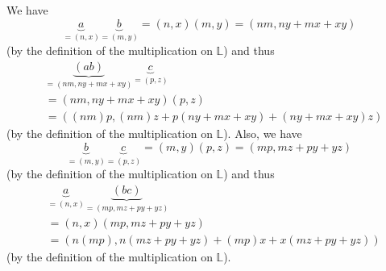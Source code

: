 \documentclass[paper=a4, fontsize=12pt]{scrartcl}%
\theoremstyle{plainsl}
\theoremstyle{definition}
\theoremstyle{remark}
\begin{document}
We have
\[
\underbrace{a}_{=\left(  n,x\right)  }\underbrace{b}_{=\left(  m,y\right)
}=\left(  n,x\right)  \left(  m,y\right)  =\left(  nm,ny+mx+xy\right)
\]
(by the definition of the multiplication on $\mathbb{L}$) and thus%
\begin{align}
&  \underbrace{\left(  ab\right)  }_{=\left(  nm,ny+mx+xy\right)
}\underbrace{c}_{=\left(  p,z\right)  }\nonumber\\
&  =\left(  nm,ny+mx+xy\right)  \left(  p,z\right) \nonumber\\
&  =\left(  \left(  nm\right)  p,\left(  nm\right)  z+p\left(
ny+mx+xy\right)  +\left(  ny+mx+xy\right)  z\right)
\label{sol.ring.dorroh.assoc-mul.pf.1}%
\end{align}
(by the definition of the multiplication on $\mathbb{L}$). Also, we have%
\[
\underbrace{b}_{=\left(  m,y\right)  }\underbrace{c}_{=\left(  p,z\right)
}=\left(  m,y\right)  \left(  p,z\right)  =\left(  mp,mz+py+yz\right)
\]
(by the definition of the multiplication on $\mathbb{L}$) and thus%
\begin{align}
&  \underbrace{a}_{=\left(  n,x\right)  }\underbrace{\left(  bc\right)
}_{=\left(  mp,mz+py+yz\right)  }\nonumber\\
&  =\left(  n,x\right)  \left(  mp,mz+py+yz\right) \nonumber\\
&  =\left(  n\left(  mp\right)  ,n\left(  mz+py+yz\right)  +\left(  mp\right)
x+x\left(  mz+py+yz\right)  \right)  \label{sol.ring.dorroh.assoc-mul.pf.2}%
\end{align}
(by the definition of the multiplication on $\mathbb{L}$).
\end{document}
